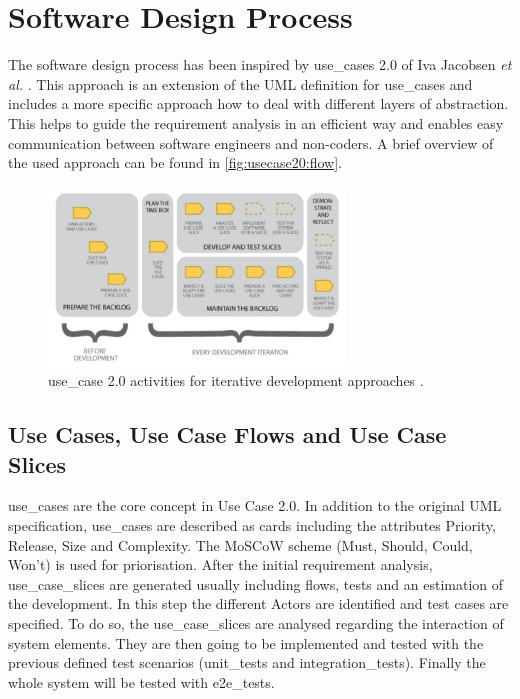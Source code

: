 \section{Software Design Process}
\label{sec:design}

The software design process has been inspired by \Glspl{use_case} 2.0 of Iva Jacobsen \textit{et al.} \cite{jacobson2011usecase}. This approach is an extension of the \gls{UML} definition for \glspl{use_case} and includes a more specific approach how to deal with different layers of abstraction. This helps to guide the requirement analysis in an efficient way and enables easy communication between software engineers and non-coders. A brief overview of the used approach can be found in \autoref{fig:usecase20:flow}.

\begin{figure}[!ht]
\centering
\includegraphics[width=0.7\textwidth]{figures/uc20_flow}
\caption{\Gls{use_case} 2.0 activities for iterative development approaches \cite{jacobson2011usecase}.}
\label{fig:usecase20:flow}
\end{figure}


\subsection{Use Cases, Use Case Flows and Use Case Slices}
\Glspl{use_case} are the core concept in Use Case 2.0. In addition to the original \gls{UML} specification, \glspl{use_case} are described as cards including the attributes Priority, Release, Size and Complexity. The MoSCoW scheme \cite{moscow} (Must, Should, Could, Won't) is used for priorisation. After the initial requirement analysis, \glspl{use_case_slice} are generated usually including flows, tests and an estimation of the development. In this step the different \glspl{Actor} are identified and test cases are specified. To do so, the \glspl{use_case_slice} are analysed regarding the interaction of system elements. They are then going to be implemented and tested with the previous defined test scenarios (\glspl{unit_test} and \glspl{integration_test}). Finally the whole system will be tested with \glspl{e2e_test}.

